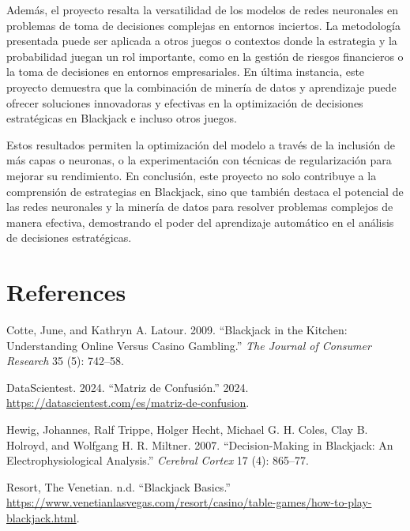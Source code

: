 \documentclass[conference,final,]{IEEEtran}
\newlength{\cslhangindent}
\newenvironment{CSLReferences}[2] %
 {\begin{list}{}{%
  \setlength{\itemindent}{0pt}
  \setlength{\leftmargin}{0pt}
  \setlength{\parsep}{0pt}
  \ifodd #1
   \setlength{\leftmargin}{\cslhangindent}
   \setlength{\itemindent}{-1\cslhangindent}
  \fi
  \setlength{\itemsep}{#2\baselineskip}}}
 {\end{list}}
\begin{document}
Además, el proyecto resalta la versatilidad de los modelos de redes
neuronales en problemas de toma de decisiones complejas en entornos
inciertos. La metodología presentada puede ser aplicada a otros juegos o
contextos donde la estrategia y la probabilidad juegan un rol
importante, como en la gestión de riesgos financieros o la toma de
decisiones en entornos empresariales. En última instancia, este proyecto
demuestra que la combinación de minería de datos y aprendizaje puede
ofrecer soluciones innovadoras y efectivas en la optimización de
decisiones estratégicas en Blackjack e incluso otros juegos.

Estos resultados permiten la optimización del modelo a través de la
inclusión de más capas o neuronas, o la experimentación con técnicas de
regularización para mejorar su rendimiento. En conclusión, este proyecto
no solo contribuye a la comprensión de estrategias en Blackjack, sino
que también destaca el potencial de las redes neuronales y la minería de
datos para resolver problemas complejos de manera efectiva, demostrando
el poder del aprendizaje automático en el análisis de decisiones
estratégicas.

\newpage

\section*{References}\label{references}

\label{refs}
\begin{CSLReferences}{1}{0}
Cotte, June, and Kathryn A. Latour. 2009. {``Blackjack in the Kitchen:
Understanding Online Versus Casino Gambling.''} \emph{The Journal of
Consumer Research} 35 (5): 742--58.

DataScientest. 2024. {``Matriz de Confusión.''} 2024.
\url{https://datascientest.com/es/matriz-de-confusion}.

Hewig, Johannes, Ralf Trippe, Holger Hecht, Michael G. H. Coles, Clay B.
Holroyd, and Wolfgang H. R. Miltner. 2007. {``Decision-Making in
Blackjack: An Electrophysiological Analysis.''} \emph{Cerebral Cortex}
17 (4): 865--77.

Resort, The Venetian. n.d. {``Blackjack Basics.''}
\url{https://www.venetianlasvegas.com/resort/casino/table-games/how-to-play-blackjack.html}.

\end{CSLReferences}
\end{document}
